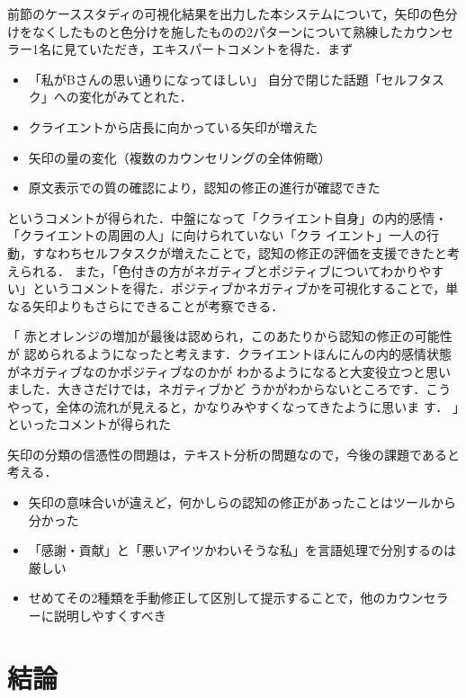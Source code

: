 \documentclass[shuuron]{kuee}
\begin{document}
前節のケーススタディの可視化結果を出力した本システムについて，矢印の色分けをなくしたものと色分けを施したものの2パターンについて熟練したカウンセラー1名に見ていただき，エキスパートコメントを得た．まず
\begin{itemize}

  \item 「私がBさんの思い通りになってほしい」
  自分で閉じた話題「セルフタスク」への変化がみてとれた．
  \item クライエントから店長に向かっている矢印が増えた
  \item 矢印の量の変化（複数のカウンセリングの全体俯瞰）
  \item 原文表示での質の確認により，認知の修正の進行が確認できた
\end{itemize}
というコメントが得られた．中盤になって「クライエント自身」の内的感情・「クライエントの周囲の人」に向けられていない「クラ
イエント」一人の行動，すなわちセルフタスクが増えたことで，認知の修正の評価を支援できたと考えられる．
また，「色付きの方がネガティブとポジティブについてわかりやすい」というコメントを得た．ポジティブかネガティブかを可視化することで，単なる矢印よりもさらにできることが考察できる．


「
赤とオレンジの増加が最後は認められ，このあたりから認知の修正の可能性が
認められるようになったと考えます．クライエントほんにんの内的感情状態がネガティブなのかポジティブなのかが
わかるようになると大変役立つと思いました．大きさだけでは，ネガティブかど
うかがわからないところです．こうやって，全体の流れが見えると，かなりみやすくなってきたように思いま
す．
」といったコメントが得られた

矢印の分類の信憑性の問題は，テキスト分析の問題なので，今後の課題であると考える．







\begin{itemize}

  \item 矢印の意味合いが違えど，何かしらの認知の修正があったことはツールから分かった
  \item 「感謝・貢献」と「悪いアイツかわいそうな私」を言語処理で分別するのは厳しい

  \item せめてその2種類を手動修正して区別して提示することで，他のカウンセラーに説明しやすくすべき

\end{itemize}
\chapter{結論}
\end{document}
